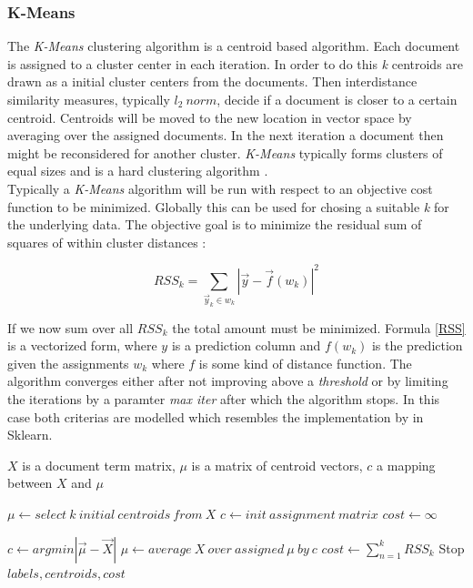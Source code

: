     \subsubsection{K-Means}
    \label{sec:k_means}

    The \emph{K-Means} clustering algorithm is a centroid based algorithm. Each document is assigned to a cluster center in each iteration. In order to do this \emph{k} centroids are drawn as a initial cluster centers from the documents. Then interdistance similarity measures, typically $l_2\:norm$, decide if a document is closer to a certain centroid. Centroids will be moved to the new location in vector space by averaging over the assigned documents. In the next iteration a document then might be reconsidered for another cluster. \emph{K-Means} typically forms clusters of equal sizes and is a hard clustering algorithm \cite{IRBookStanford2008}.\\
    Typically a \emph{K-Means} algorithm will be run with respect to an objective cost function to be minimized. Globally this can be used for chosing a suitable \emph{k} for the underlying data. The objective goal is to minimize the residual sum of squares of within cluster distances \cite{IRBookStanford2008}:

      \begin{equation}
        RSS_k = \sum_{\vec{y}_k \in \textit{w}_k}|\vec{y} - \vec{f}(\textit{w}_k)|^{2}
        \label{RSS}
      \end{equation}

    If we now sum over all $RSS_k$ the total amount must be minimized. Formula \ref{RSS} is a vectorized form, where $y$ is a prediction column and $f(w_k)$ is the prediction given the assignments $w_k$ where $f$ is some kind of distance function. The algorithm converges either after not improving above a \emph{threshold} or by limiting the iterations by a paramter \emph{max iter} after which the algorithm stops. In this case both criterias are modelled which resembles the implementation by \cite{ScikitLearn} in Sklearn.

    \begin{algorithm}[H]
    \begin{algorithmic}[1]
      \caption{$X$ is a document term matrix, $\mu$ is a matrix of centroid vectors, $c$ a mapping between $X$ and $\mu$}\label{kmeans}
        \State $\mu \gets select\:k\:initial\:centroids\:from\:X$
        \State $c \gets init\:assignment\:matrix {}$
        \State $cost \gets \infty$

          \State $c \gets argmin|\vec{\mu} - \vec{X}|$ 
          \State $\mu \gets average\:X\:over\:assigned\:\mu\:by\:c$
          \State $cost \gets \sum_{n = 1}^{k}RSS_k$
            \State Stop
          \EndIf
        \EndFor
        \State \Return $labels, centroids, cost$
      \EndFunction
    \end{algorithmic}
    \end{algorithm}

